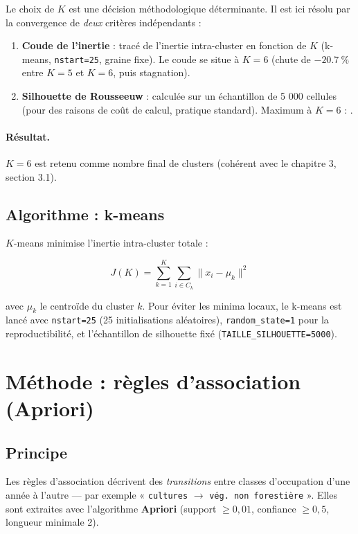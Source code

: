 Le choix de $K$ est une décision méthodologique déterminante. Il est ici
résolu par la convergence de \emph{deux} critères indépendants :
\begin{enumerate}
  \item \textbf{Coude de l'inertie} : tracé de l'inertie intra-cluster en
        fonction de $K$ (k-means, \texttt{nstart=25}, graine fixe). Le coude
        se situe à $K=6$ (chute de $-\SI{20,7}{\percent}$ entre $K=5$ et
        $K=6$, puis stagnation).
  \item \textbf{Silhouette de Rousseeuw} : calculée sur un échantillon de
        5 000 cellules (pour des raisons de coût de calcul, pratique
        standard). Maximum à $K=6$ : .
\end{enumerate}

\paragraph{Résultat.} $K=6$ est retenu comme nombre final de clusters
(cohérent avec le chapitre 3, section 3.1).

\subsection{Algorithme : k-means}

$K$-means minimise l'inertie intra-cluster totale :

\[
J(K) = \sum_{k=1}^{K} \sum_{i \in C_k} \lVert x_i - \mu_k \rVert^2
\]

avec $\mu_k$ le centroïde du cluster $k$. Pour éviter les minima locaux, le
k-means est lancé avec \texttt{nstart=25} (25 initialisations aléatoires),
\texttt{random\_state=1} pour la reproductibilité, et l'échantillon de
silhouette fixé (\texttt{TAILLE\_SILHOUETTE=5000}).

\section{Méthode : règles d'association (Apriori)}

\subsection{Principe}

Les règles d'association décrivent des \emph{transitions} entre classes
d'occupation d'une année à l'autre — par exemple
« \texttt{cultures} $\rightarrow$ \texttt{vég. non forestière} ». Elles sont
extraites avec l'algorithme \textbf{Apriori} (support $\geq 0{,}01$,
confiance $\geq 0{,}5$, longueur minimale 2).

